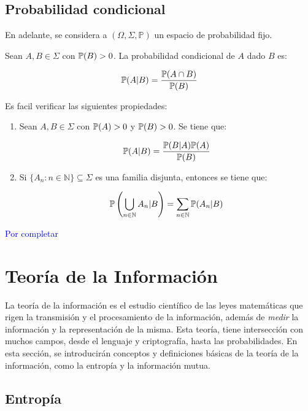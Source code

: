 \subsection{Probabilidad condicional}

En adelante, se considera a $(\Omega, \Sigma, \mathbb{P})$ un espacio de probabilidad fijo.

\begin{definition}
Sean $A,B\in\Sigma$ con $\mathbb{P} (B)>0$. La probabilidad condicional de $A$ dado $B$ es:

\[\mathbb{P} (A|B)=\dfrac{\mathbb{P} (A\cap B)}{\mathbb{P}(B)}\]
\end{definition}

Es facil verificar las siguientes propiedades:

\begin{enumerate}
    \item Sean $A,B\in\Sigma$ con $\mathbb{P} (A)>0$ y $\mathbb{P} (B)>0$. Se tiene que:

\[\mathbb{P}(A|B)=\dfrac{\mathbb{P}(B|A)\mathbb{P}(A)}{\mathbb{P}(B)}\]

\item Si $\{A_n:n\in\mathbb{N}\}\subseteq \Sigma$ es una familia disjunta, entonces se tiene que:

\[\mathbb{P}\left(\bigcup\limits_{n\in\mathbb{N}}A_n|B\right)=\sum\limits_{n\in\mathbb{N}}\mathbb{P}(A_n|B)\]
\end{enumerate}

\textcolor{blue}{Por completar}


 


\section{Teoría de la Información}

La teoría de la información es el estudio científico de las leyes matemáticas que rigen la transmisión y el procesamiento de la información, además de \emph{medir} la información y la representación de la misma. Esta teoría, tiene intersección con muchos campos, desde el lenguaje y criptografía, hasta las probabilidades. En esta sección, se introducirán conceptos y definiciones básicas de la teoría de la información, como la entropía y la información mutua. 


\subsection{Entropía}

